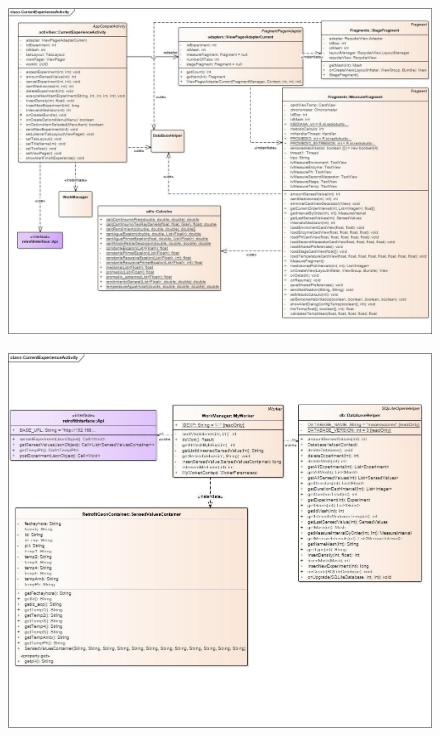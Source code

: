     
    \begin{figure}
        \centering
        \includegraphics[scale=0.6, angle=90]{Anexo/DiagramasClase/CurrentExperienceActivity-P1.jpg}
        \label{fig:DiagClaseCurrentExperienceActivityP1}
    \end{figure}
    
    \begin{figure}
        \centering
        \includegraphics[scale=0.6, angle=90]{Anexo/DiagramasClase/CurrentExperienceActivity-P2.jpg}
        \label{fig:DiagClaseCurrentExperienceActivityP2}
    \end{figure}
    
